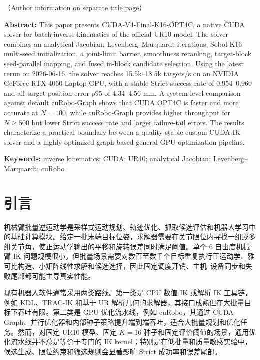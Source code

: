 \documentclass[twocolumn,a4paper,10pt]{ctexart}
\begin{document}
\vspace{1mm}
{\small （Author information on separate title page）}

\vspace{2mm}
{\bfseries Abstract:} This paper presents CUDA-V4-Final-K16-OPT4C, a native CUDA solver for batch inverse kinematics of the official UR10 model. The solver combines an analytical Jacobian, Levenberg--Marquardt iterations, Sobol-K16 multi-seed initialization, a joint-limit barrier, smoothness reranking, target-block seed-parallel mapping, and fused in-block candidate selection. Using the latest rerun on 2026-06-16, the solver reaches 15.5k--18.5k targets/s on an NVIDIA GeForce RTX 4060 Laptop GPU, with a stable Strict success rate of 0.954--0.960 and all-target position-error $p95$ of 4.34--4.56 mm. A system-level comparison against default cuRobo-Graph shows that CUDA OPT4C is faster and more accurate at $N=100$, while cuRobo-Graph provides higher throughput for $N\ge500$ but lower Strict success rate and larger failure-tail errors. The results characterize a practical boundary between a quality-stable custom CUDA IK solver and a highly optimized graph-based general GPU optimization pipeline.

\vspace{1mm}
{\bfseries Keywords:} inverse kinematics; CUDA; UR10; analytical Jacobian; Levenberg--Marquardt; cuRobo

\section{引言}

机械臂批量逆运动学是采样式运动规划、轨迹优化、抓取候选评估和机器人学习中的基础计算模块。给定一批末端目标位姿，求解器需要在关节限位内寻找一组或多组关节角，使正运动学输出的平移和旋转误差同时满足阈值。单个 6 自由度机械臂 IK 问题规模很小，但批量场景需要对数百至数千个目标重复执行正运动学、雅可比构造、小矩阵线性求解和候选选择，因此固定调度开销、主机--设备同步和失败尾部都可能主导真实性能。

现有机器人软件通常采用两类路线。第一类是 CPU 数值 IK 或解析 IK 工具链，例如 KDL、TRAC-IK 和基于 UR 解析几何的求解器，其接口成熟但在大批量目标下吞吐有限。第二类是 GPU 优化流水线，例如 cuRobo，其通过 CUDA Graph、并行优化器和内部种子策略提升端到端吞吐，适合大批量规划和优化任务。然而，对固定 UR10 模型、固定 $K=16$ 种子和固定评价阈值的场景，通用优化流水线并不总是等价于专门的 IK kernel；特别是在低批量和质量敏感实验中，候选生成、限位约束和筛选规则会显著影响 Strict 成功率和误差尾部。
\end{document}
